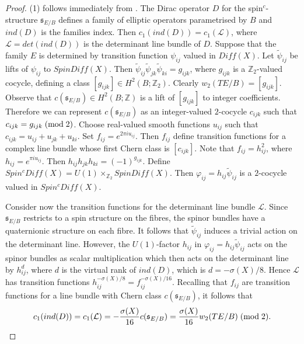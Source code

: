 \documentclass{amsart}
\theoremstyle{definition}
\theoremstyle{remark}
\numberwithin{equation}{section}
\begin{document}
\begin{proof}
(1) follows immediately from \cite[Proposition 2.1]{bar1}. The Dirac operator $D$ for the spin$^c$-structure $\mathfrak{s}_{E/B}$ defines a family of elliptic operators parametrised by $B$ and $ind(D)$ is the families index. Then $c_1( ind(D)) = c_1(\mathcal{L})$, where $\mathcal{L} = det(ind(D))$ is the determinant line bundle of $D$. Suppose that the family $E$ is determined by transition function $\psi_{ij}$ valued in $Diff(X)$. Let $\widetilde{\psi}_{ij}$ be lifts of $\psi_{ij}$ to $SpinDiff(X)$. Then $\widetilde{\psi}_{ij} \widetilde{\psi}_{jk} \widetilde{\psi}_{ki} = g_{ijk}$, where $g_{ijk}$ is a $\mathbb{Z}_2$-valued cocycle, defining a class $[g_{ijk}] \in H^2( B ; \mathbb{Z}_2)$. Clearly $w_2( TE/B) = [g_{ijk}]$. Observe that $c(\mathfrak{s}_{E/B}) \in H^2( B ; \mathbb{Z})$ is a lift of $[g_{ijk}]$ to integer coefficients. Therefore we can represent $c(\mathfrak{s}_{E/B})$ as an integer-valued $2$-cocycle $c_{ijk}$ such that $c_{ijk} = g_{ijk} \; ({\rm mod} \; 2)$. Choose real-valued smooth functions $u_{ij}$ such that $c_{ijk} = u_{ij} + u_{jk} + u_{ki}$. Set $f_{ij} = e^{2 \pi i u_{ij}}$. Then $f_{ij}$ define transition functions for a complex line bundle whose first Chern class is $[c_{ijk}]$. Note that $f_{ij} = h_{ij}^2$, where $h_{ij} = e^{\pi i u_{ij}}$. Then $h_{ij} h_{jk} h_{ki} = (-1)^{g_{ijk}}$. Define $Spin^c Diff(X) = U(1) \times_{\mathbb{Z}_2} SpinDiff(X)$. Then $\varphi_{ij} = h_{ij} \widetilde{\psi}_{ij}$ is a $2$-cocycle valued in $Spin^cDiff(X)$.

Consider now the transition functions for the determinant line bundle $\mathcal{L}$. Since $\mathfrak{s}_{E/B}$ restricts to a spin structure on the fibres, the spinor bundles have a quaternionic structure on each fibre. It follows that $\widetilde{\psi}_{ij}$ induces a trivial action on the determinant line. However, the $U(1)$-factor $h_{ij}$ in $\varphi_{ij} = h_{ij} \widetilde{\psi}_{ij}$ acts on the spinor bundles as scalar multiplication which then acts on the determinant line by $h_{ij}^{d}$, where $d$ is the virtual rank of $ind(D)$, which is $d = -\sigma(X)/8$. Hence $\mathcal{L}$ has transition functions $h_{ij}^{-\sigma(X)/8} = f_{ij}^{-\sigma(X)/16}$. Recalling that $f_{ij}$ are transition functions for a line bundle with Chern class $c(\mathfrak{s}_{E/B})$, it follows that
\[
c_1(ind(D)) = c_1(\mathcal{L}) = -\frac{\sigma(X)}{16} c( \mathfrak{s}_{E/B}) = \frac{\sigma(X)}{16} w_2( TE/B) \; ({\rm mod} \; 2).
\]
\end{proof}
\end{document}
